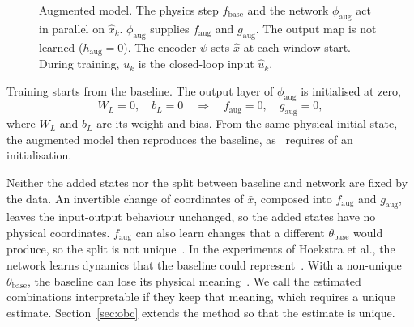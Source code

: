 \begin{figure}[t]
 \centering
 \resizebox{\columnwidth}{!}{}
 \caption{Augmented model. The physics step $f_{\mathrm{base}}$ and the
 network $\phi_{\mathrm{aug}}$ act in parallel on $\hat x_k$.
 $\phi_{\mathrm{aug}}$ supplies $f_{\mathrm{aug}}$ and $g_{\mathrm{aug}}$.
 The output map is not learned ($h_{\mathrm{aug}}=0$). The encoder
 $\psi$ sets $\hat x$ at each window start. During training, $u_k$ is the
 closed-loop input $\hat u_k$.
 }
 \label{fig:aug_structure}
\end{figure}

Training starts from the baseline.
The output layer of $\phi_{\mathrm{aug}}$ is initialised at zero,
\begin{equation}
 W_L=0,\quad b_L=0
 \quad\Longrightarrow\quad
 f_{\mathrm{aug}}=0,\quad g_{\mathrm{aug}}=0,
 \label{eq:aug_zero_init}
\end{equation}
where $W_L$ and $b_L$ are its weight and bias.
From the same physical initial state, the augmented model then reproduces the
baseline, as~\cite[Eq.~(29)]{hoekstra2026lfr} requires of an initialisation.

Neither the added states nor the split between baseline and network are
fixed by the data.
An invertible change of coordinates of $\bar x$, composed into
$f_{\mathrm{aug}}$ and $g_{\mathrm{aug}}$, leaves the input-output behaviour
unchanged, so the added states have no physical coordinates.
$f_{\mathrm{aug}}$ can also learn changes that a different
$\theta_{\mathrm{base}}$ would produce, so the split is not
unique~\cite[Sec.~5.2]{hoekstra2026lfr}.
In the experiments of Hoekstra et al., the network learns dynamics that the
baseline could represent~\cite[Sec.~6.3]{hoekstra2026lfr}.
With a non-unique $\theta_{\mathrm{base}}$, the baseline can lose its physical
meaning~\cite[Sec.~3]{gyorok2026obc}.
We call the estimated combinations interpretable if they keep that meaning,
which requires a unique estimate.
Section~\ref{sec:obc} extends the method so that the estimate is unique.


